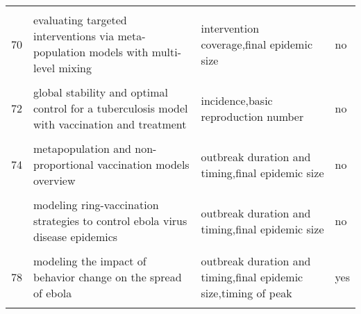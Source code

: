 \documentclass[
]{article}
\begin{document}
\begin{landscape}
\begin{longtable}{l>{\raggedright\arraybackslash}p{4cm}>{\raggedright\arraybackslash}p{6cm}l}
\cellcolor{gray!6}{69} & \cellcolor{gray!6}{epidemiological evaluation of different fmd control strategies in two selected regions in austria} & \cellcolor{gray!6}{intervention coverage,outbreak duration and timing,final epidemic size} & \cellcolor{gray!6}{yes}\\
70 & evaluating targeted interventions via meta-population models with multi-level mixing & intervention coverage,final epidemic size & no\\
\addlinespace
\cellcolor{gray!6}{71} & \cellcolor{gray!6}{evaluation of outbreak response immunization in the control of pertussis using agent-based modeling} & \cellcolor{gray!6}{cases averted,cumulative incidence} & \cellcolor{gray!6}{yes}\\
72 & global stability and optimal control for a tuberculosis model with vaccination and treatment & incidence,basic reproduction number & no\\
\cellcolor{gray!6}{73} & \cellcolor{gray!6}{impact on epidemic measles of vaccination campaigns triggered by disease outbreaks or serosurveys: a modeling study} & \cellcolor{gray!6}{cases averted} & \cellcolor{gray!6}{yes}\\
74 & metapopulation and non-proportional vaccination models overview & outbreak duration and timing,final epidemic size & no\\
\cellcolor{gray!6}{75} & \cellcolor{gray!6}{model-based comprehensive analysis of school closure policies for mitigating influenza epidemics and pandemics} & \cellcolor{gray!6}{timing of peak,attack rate,peak incidence,average number of weeks lost} & \cellcolor{gray!6}{yes}\\
\addlinespace
76 & modeling ring-vaccination strategies to control ebola virus disease epidemics & outbreak duration and timing,final epidemic size & no\\
\cellcolor{gray!6}{77} & \cellcolor{gray!6}{modeling the effect of public health resources and alerting on the dynamics of pertussis spread*} & \cellcolor{gray!6}{outbreak duration and timing,final epidemic size,number of contacts traced} & \cellcolor{gray!6}{yes}\\
78 & modeling the impact of behavior change on the spread of ebola & outbreak duration and timing,final epidemic size,timing of peak & yes\\
\cellcolor{gray!6}{79} & \cellcolor{gray!6}{modeling the spread of polio in an ipv-vaccinated population: lessons learned from the 2013 silent outbreak in southern israel} & \cellcolor{gray!6}{outbreak duration and timing,cumulative incidence} & \cellcolor{gray!6}{yes}\\

\end{longtable}
\end{landscape}
\end{document}
